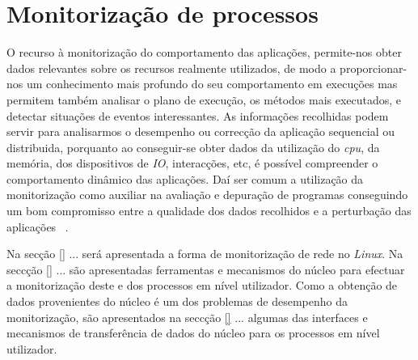 \chapter{Monitorização de processos}
\label{cap:trabrelacionado}
O recurso à monitorização do comportamento das aplicações, permite-nos obter dados relevantes sobre os recursos realmente utilizados, de modo a proporcionar-nos um conhecimento mais profundo do seu comportamento em execuções mas permitem também analisar o plano de execução, os métodos mais executados, e detectar situações de eventos interessantes.
As informações recolhidas podem servir para analisarmos o desempenho ou correcção da aplicação sequencial ou distribuida, porquanto ao conseguir-se obter dados da utilização do \textit{cpu}, da memória, dos dispositivos de \textit{IO}, interacções, etc, é possível compreender o comportamento dinâmico das aplicações.
Daí ser comum a utilização da monitorização como auxiliar na avaliação e depuração de programas conseguindo um bom compromisso entre a qualidade dos dados recolhidos e a perturbação das aplicações ~\cite{DuartePhd05}.
 
Na secção \ref{} ... será apresentada a forma de monitorização de rede no \textit{Linux}.
Na seccção \ref{} ... são apresentadas ferramentas e mecanismos do núcleo para efectuar a monitorização deste e dos processos em nível utilizador.
Como a obtenção de dados provenientes do núcleo é um dos problemas de desempenho da monitorização, são apresentados na seccção \ref{} ... algumas das interfaces e mecanismos de transferência de dados do núcleo para os processos em nível utilizador.

 


